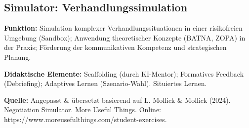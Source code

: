 \documentclass[
  ngerman,
  letterpaper,
  DIV=11]{scrreprt}
\begin{document}
\subsection{Simulator:
Verhandlungssimulation}\label{sec-prompt-verhandlungssimulator}

\textbf{Funktion:} Simulation komplexer Verhandlungssituationen in einer
risikofreien Umgebung (Sandbox); Anwendung theoretischer Konzepte
(BATNA, ZOPA) in der Praxis; Förderung der kommunikativen Kompetenz und
strategischen Planung.

\textbf{Didaktische Elemente:} Scaffolding (durch KI-Mentor); Formatives
Feedback (Debriefing); Adaptives Lernen (Szenario-Wahl). Situiertes
Lernen.

\textbf{Quelle:} Angepasst \& übersetzt basierend auf L. Mollick \&
Mollick (2024). Negotiation Simulator. More Useful Things. Online:
https://www.moreusefulthings.com/student-exercises.
\end{document}
